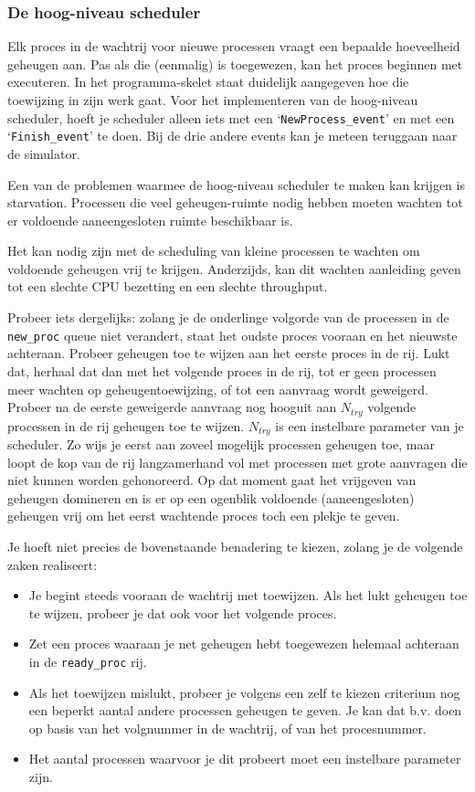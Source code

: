 \documentclass[11pt,a4paper,twoside]{article}
\begin{document}
\subsubsection*{De hoog-niveau scheduler}


Elk proces in de wachtrij voor nieuwe processen vraagt een bepaalde
hoeveelheid geheugen aan. Pas als die (eenmalig) is toegewezen, kan het
proces beginnen met executeren. In het programma-skelet staat duidelijk
aangegeven hoe die toewijzing in zijn werk gaat. Voor het implementeren
van de hoog-niveau scheduler, hoeft je scheduler alleen iets met een `\texttt{NewProcess\_event}'
en met een `\texttt{Finish\_event}' te doen. Bij de drie andere events
kan je meteen teruggaan naar de simulator. 

 Een van de problemen waarmee de hoog-niveau scheduler te maken kan
krijgen is starvation. Processen die veel geheugen-ruimte nodig hebben
moeten wachten tot er voldoende aaneengesloten ruimte beschikbaar is. 

 Het kan nodig zijn met de scheduling van kleine processen te
wachten
om voldoende geheugen vrij te krijgen. Anderzijds, kan dit wachten
aanleiding geven tot een slechte CPU bezetting en een slechte
throughput.

Probeer iets dergelijks: zolang je de onderlinge volgorde van de processen
in de \texttt{new\_proc} queue niet verandert, staat het oudste proces vooraan en het
nieuwste achteraan. Probeer geheugen toe te wijzen aan het eerste proces in de rij. Lukt dat,
herhaal dat dan met het volgende proces in de rij, tot er geen processen meer wachten op 
geheugentoewijzing, of tot een aanvraag wordt geweigerd. Probeer na de eerste geweigerde aanvraag
nog hooguit aan $N_{try}$ volgende processen in de rij geheugen toe te wijzen. $N_{try}$ is een 
instelbare parameter van je scheduler. Zo wijs je eerst aan zoveel mogelijk processen geheugen toe,
maar loopt de kop van de rij langzamerhand vol met processen met grote aanvragen die niet kunnen
worden gehonoreerd. Op dat moment gaat het vrijgeven van geheugen domineren en is er op een ogenblik
voldoende (aaneengesloten) geheugen vrij om het eerst wachtende proces toch een plekje te geven.

Je hoeft niet precies de bovenstaande benadering te kiezen, zolang je de volgende zaken realiseert:
\begin{itemize}
\item Je begint steeds vooraan de wachtrij met toewijzen. Als het lukt geheugen toe te wijzen, probeer je dat ook voor het volgende proces.
\item Zet een proces waaraan je net geheugen hebt toegewezen helemaal achteraan in de \texttt{ready\_proc} rij.
\item Als het toewijzen mislukt, probeer je volgens een zelf te kiezen criterium nog een beperkt aantal andere processen geheugen te geven. Je kan dat b.v. doen op basis van het volgnummer in de wachtrij, of van het procesnummer.
\item Het aantal processen waarvoor je dit probeert moet een instelbare parameter zijn.
\end{itemize}
\end{document}
